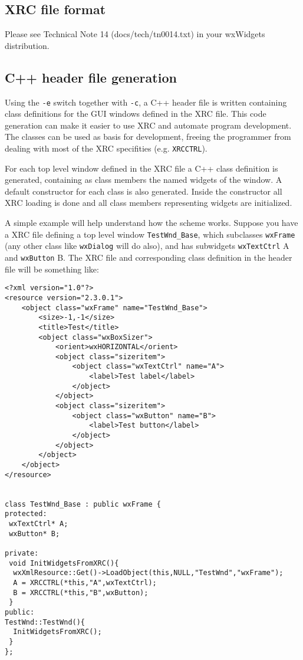\subsection{XRC file format}\label{xrcfileformat}

Please see Technical Note 14 (docs/tech/tn0014.txt) in your wxWidgets
distribution.

\subsection{C++ header file generation}\label{xrccppheader}

Using the {\tt -e} switch together with {\tt -c}, a C++ header file is written
containing class definitions for the GUI windows defined in the XRC file.
This code generation can make it easier to use XRC and automate program
development.
The classes can be used as basis for development, freeing the
programmer from dealing with most of the XRC specifities (e.g. {\tt XRCCTRL}).

For each top level window defined in the XRC file a C++ class definition is
generated, containing as class members the named widgets of the window.
A default constructor for each class is also generated. Inside the constructor 
all XRC loading is done and all class members representing widgets are initialized. 

A simple example will help understand how the scheme works. Suppose you have
a XRC file defining a top level window {\tt TestWnd\_Base}, which subclasses {\tt wxFrame} (any 
other class like {\tt wxDialog} will do also), and has subwidgets {\tt wxTextCtrl} A and {\tt wxButton} B.
The XRC file and corresponding class definition in the header file will be something like:

\begin{verbatim}
<?xml version="1.0"?>
<resource version="2.3.0.1">
    <object class="wxFrame" name="TestWnd_Base">
        <size>-1,-1</size>
        <title>Test</title>
        <object class="wxBoxSizer">
            <orient>wxHORIZONTAL</orient>
            <object class="sizeritem">
                <object class="wxTextCtrl" name="A">
                    <label>Test label</label>
                </object>
            </object>
            <object class="sizeritem">
                <object class="wxButton" name="B">
                    <label>Test button</label>
                </object>
            </object>
        </object>
    </object>
</resource>


class TestWnd_Base : public wxFrame {
protected:
 wxTextCtrl* A;
 wxButton* B;

private:
 void InitWidgetsFromXRC(){
  wxXmlResource::Get()->LoadObject(this,NULL,"TestWnd","wxFrame");
  A = XRCCTRL(*this,"A",wxTextCtrl);
  B = XRCCTRL(*this,"B",wxButton);
 }
public:
TestWnd::TestWnd(){
  InitWidgetsFromXRC();
 }
};
\end{verbatim}

